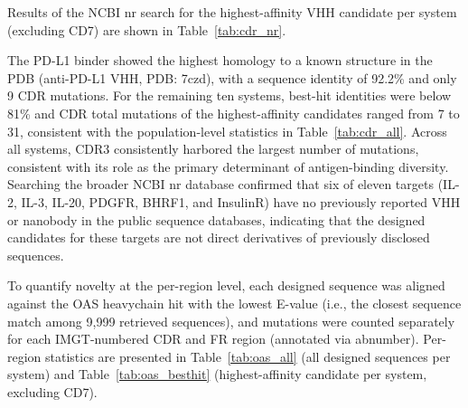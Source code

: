 \documentclass[11pt]{article}
\begin{document}
Results of the NCBI nr search for the highest-affinity VHH candidate per system (excluding CD7) are
shown in Table~\ref{tab:cdr_nr}.

The PD-L1 binder showed the highest homology to a known structure in the PDB (anti-PD-L1 VHH, PDB:
7czd), with a sequence identity of 92.2\% and only 9 CDR mutations. For the remaining ten systems, best-hit
identities were below 81\% and CDR total mutations of the highest-affinity candidates ranged from 7 to 31,
consistent with the population-level statistics in Table~\ref{tab:cdr_all}. Across all systems, CDR3 consistently harbored the
largest number of mutations, consistent with its role as the primary determinant of antigen-binding diversity.
Searching the broader NCBI nr database confirmed that six of eleven targets (IL-2, IL-3, IL-20, PDGFR, BHRF1,
and InsulinR) have no previously reported VHH or nanobody in the public sequence databases, indicating
that the designed candidates for these targets are not direct derivatives of previously disclosed sequences.

To quantify novelty at the per-region level, each designed sequence was aligned against the OAS heavychain hit with the lowest E-value (i.e., the closest sequence match among 9,999 retrieved sequences), and
mutations were counted separately for each IMGT-numbered CDR and FR region (annotated via abnumber).
Per-region statistics are presented in Table~\ref{tab:oas_all} (all designed sequences per system) and Table~\ref{tab:oas_besthit} (highest-affinity
candidate per system, excluding CD7).
\end{document}
